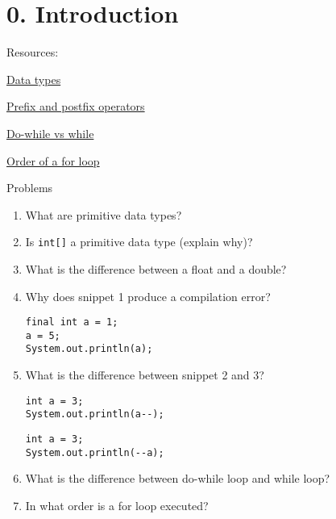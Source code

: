 \documentclass[12pt,letterpaper]{article}
\newcommand\hwnumber{0}
\begin{document}
\section*{\hwnumber. Introduction}
Resources:
\begin{description}
    \item \href{https://docs.oracle.com/javase/tutorial/java/nutsandbolts/datatypes.html}{Data types}
    \item \href{https://stackoverflow.com/questions/5413548/java-prefix-postfix-of-increment-decrement-operators}{Prefix and postfix operators}
    \item \href{https://stackoverflow.com/questions/20044845/do-while-and-while-comparison}{Do-while vs while}
    \item \href{https://www.quora.com/In-which-order-is-a-for-loop-in-java-executed}{Order of a for loop}
\end{description}


Problems
\begin{enumerate}
\item
What are primitive data types?

\item
Is \lstinline[]$int[]$ a primitive data type (explain why)?

\item
What is the difference between a float and a double?

\item
Why does snippet 1 produce a compilation error?
\begin{lstlisting}[caption={\mbox{}}]
final int a = 1;
a = 5;
System.out.println(a);
\end{lstlisting}

\item
What is the difference between snippet 2 and 3?
\begin{lstlisting}[caption={\mbox{}}]
int a = 3;
System.out.println(a--);
\end{lstlisting}
\begin{lstlisting}[caption={\mbox{}}]
int a = 3;
System.out.println(--a);
\end{lstlisting}

\item
What is the difference between do-while loop and while loop?

\item
In what order is a for loop executed?

\end{enumerate}
\end{document}
